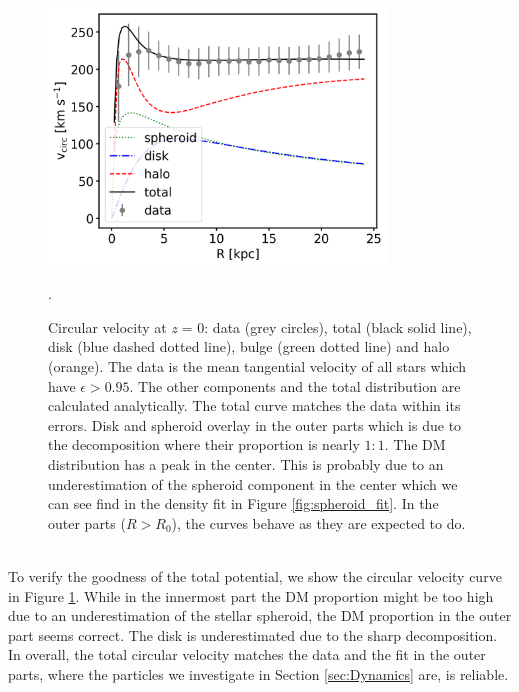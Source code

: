 \begin{figure}[htbp]
\captionsetup{format=plain}
\centering
\includegraphics[width=0.8\textwidth]{plots/Auriga/best_fit_circular_velocity_via_formula_snap_127.png}
\caption{Circular velocity at \textit{z} = 0: data (grey circles), total (black solid line), disk (blue dashed dotted line), bulge (green dotted line) and halo (orange). The data is the mean tangential velocity of all stars which have $\epsilon > 0.95$. The other components and the total distribution are calculated analytically. The total curve matches the data within its errors. Disk and spheroid overlay in the outer parts which is due to the decomposition where their proportion is nearly $1:1$. The \ac{DM} distribution has a peak in the center. This is probably due to an underestimation of the spheroid component in the center which we can see find in the density fit in Figure \ref{fig:spheroid_fit}. In the outer parts ($R>R_0$), the curves behave as they are expected to do.}. \label{fig:circ_vel_fit}
\end{figure}
\\To verify the goodness of the total potential, we show the circular velocity curve in Figure \ref{fig:circ_vel_fit}. While in the innermost part the \ac{DM} proportion might be too high due to an underestimation of the stellar spheroid, the \ac{DM} proportion in the outer part seems correct. The disk is underestimated due to the sharp decomposition. In overall, the total circular velocity matches the data and the fit in the outer parts, where the particles we investigate in Section \ref{sec:Dynamics} are, is reliable.  

